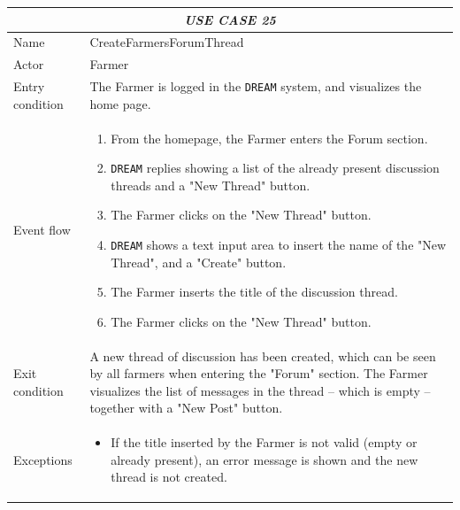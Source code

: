 \documentclass{article}
\begin{document}

\centering
\begin{longtable}{|p{3.5cm}|m{8cm}|}
 \hline
 \multicolumn{2}{|c|}{\cellcolor{white}\emph{USE CASE 25}} \\
 \endfirsthead
 \endhead
 \endfoot
 \endlastfoot
 \hline
 Name & CreateFarmersForumThread\\
 \hline
 Actor & Farmer\\
 \hline
 Entry condition & The Farmer is logged in the \verb|DREAM| system, and visualizes the home page.\\
 \hline
 Event flow & \begin{enumerate}
    \item From the homepage, the Farmer enters the Forum section.
    \item \verb|DREAM| replies showing a list of the already present discussion threads and a "New Thread" button.
    \item The Farmer clicks on the "New Thread" button.
    \item \verb|DREAM| shows a text input area to insert the name of the "New Thread",  and a "Create" button.
    \item The Farmer inserts the title of the discussion thread.
    \item The Farmer clicks on the "New Thread" button.

 \end{enumerate}\\
 \hline
 Exit condition & A new thread of discussion has been created, which can be seen by all farmers when entering the "Forum" section.
The Farmer visualizes the list of messages in the thread – which is empty – together with a "New Post" button.\\
 \hline
 Exceptions & \begin{itemize}
     \item If the title inserted by the Farmer is not valid (empty or already present), an error message is shown and the new thread is not created.
 \end{itemize}\\
 \hline
\end{longtable}

\end{document}
